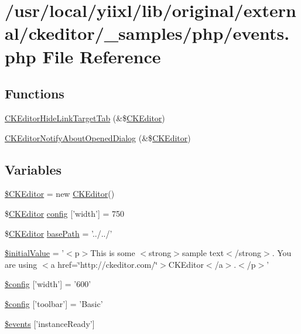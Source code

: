 \hypertarget{events_8php}{
\section{/usr/local/yiixl/lib/original/external/ckeditor/\_\-samples/php/events.php File Reference}
\label{events_8php}
}
\subsection*{Functions}
\begin{DoxyCompactItemize}
\item 
\hyperlink{events_8php_a4cb5ca547edc62e0519cd90e52ff511b}{CKEditorHideLinkTargetTab} (\&\$\hyperlink{classCKEditor}{CKEditor})
\item 
\hyperlink{events_8php_a0ea717e95cf4a42dfbe26d75142862ac}{CKEditorNotifyAboutOpenedDialog} (\&\$\hyperlink{classCKEditor}{CKEditor})
\end{DoxyCompactItemize}
\subsection*{Variables}
\begin{DoxyCompactItemize}
\item 
\hyperlink{events_8php_aec6d261a24c9dcb30ee1cfa7762a4a44}{\$CKEditor} = new \hyperlink{classCKEditor}{CKEditor}()
\item 
\$\hyperlink{classCKEditor}{CKEditor} \hyperlink{events_8php_a3f176ffce3afa63656bfc989470e3e24}{config} \mbox{[}'width'\mbox{]} = 750
\item 
\$\hyperlink{classCKEditor}{CKEditor} \hyperlink{events_8php_a94a267f018012b013582daafb6a89618}{basePath} = '../../'
\item 
\hyperlink{events_8php_ab352e6e5b00f0a2533b1b64b8306e95f}{\$initialValue} = '$<$p$>$This is some $<$strong$>$sample text$<$/strong$>$. You are using $<$a href=\char`\"{}http://ckeditor.com/\char`\"{}$>$CKEditor$<$/a$>$.$<$/p$>$'
\item 
\hyperlink{events_8php_a408217578a0d3d323ea2981957783cb8}{\$config} \mbox{[}'width'\mbox{]} = '600'
\item 
\hyperlink{events_8php_aea8fdfb38b8f02d1fc431d35e6dfc892}{\$config} \mbox{[}'toolbar'\mbox{]} = 'Basic'
\item 
\hyperlink{events_8php_a39ea8a713233b952d0bc0e6b1679fd46}{\$events} \mbox{[}'instanceReady'\mbox{]}
\end{DoxyCompactItemize}


